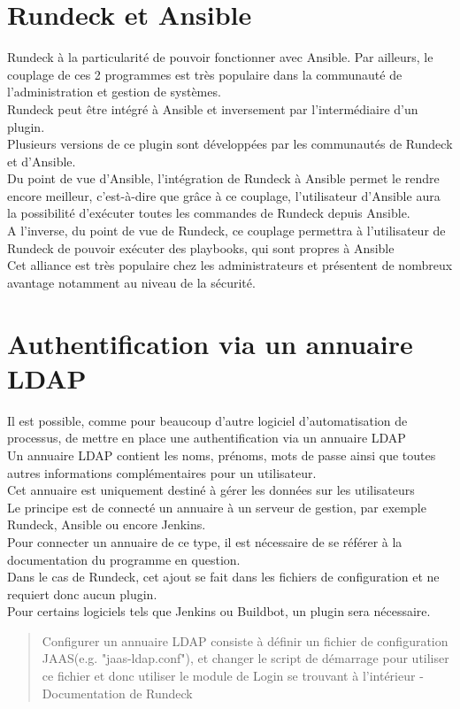 \documentclass[12pt]{article}
\begin{document}
\section{Rundeck et Ansible}
Rundeck à la particularité de pouvoir fonctionner avec Ansible. Par ailleurs, le couplage de ces 2 programmes est très populaire dans la communauté de l'administration et gestion de systèmes. 
\\
Rundeck peut être intégré à Ansible et inversement par l'intermédiaire d'un plugin.
\\
Plusieurs versions de ce plugin sont développées par les communautés de Rundeck et d'Ansible.
\\
Du point de vue d'Ansible, l'intégration de Rundeck à Ansible permet le rendre encore meilleur, c'est-à-dire que grâce à ce couplage, l'utilisateur d'Ansible aura la possibilité d'exécuter toutes les commandes de Rundeck depuis Ansible.
\\
A l'inverse, du point de vue de Rundeck, ce couplage permettra à l'utilisateur de Rundeck de pouvoir exécuter des playbooks, qui sont propres à Ansible
\\
Cet alliance est très populaire chez les administrateurs et présentent de nombreux avantage notamment au niveau de la sécurité.

\section{Authentification via un annuaire LDAP}
Il est possible, comme pour beaucoup d'autre logiciel d'automatisation de processus, de mettre en place une authentification via un annuaire LDAP\footnotemark[1]
\\
Un annuaire LDAP contient les noms, prénoms, mots de passe ainsi que toutes autres informations complémentaires pour un utilisateur.
\\
Cet annuaire est uniquement destiné à gérer les données sur les utilisateurs
\\
Le principe est de connecté un annuaire à un serveur de gestion, par exemple Rundeck, Ansible ou encore Jenkins.
\\
Pour connecter un annuaire de ce type, il est nécessaire de se référer à la documentation du programme en question.
\\
Dans le cas de Rundeck, cet ajout se fait dans les fichiers de configuration et ne requiert donc aucun plugin.
\\
Pour certains logiciels tels que Jenkins ou Buildbot, un plugin sera nécessaire.
\\
\begin{quote}
    Configurer un annuaire LDAP consiste à définir un fichier de configuration JAAS\footnotemark[2] (e.g. "jaas-ldap.conf"), et changer le script de démarrage pour utiliser ce fichier et donc utiliser le module de Login se trouvant à l'intérieur - Documentation de Rundeck
\end{quote}
\end{document}
